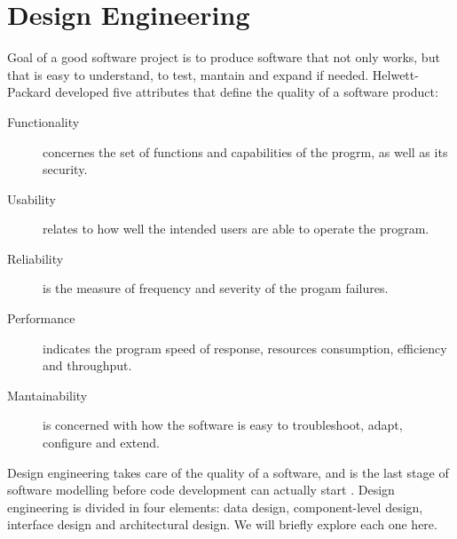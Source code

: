 \section{Design Engineering}
Goal of a good software project is to produce software that not only works, but
that is easy to understand, to test, mantain and expand if needed.
Helwett-Packard developed five attributes \cite{RG87} that define the quality of
a software product:
\begin{description}
\item [Functionality] concernes the set of functions and capabilities of the
progrm, as well as its security.
\item [Usability] relates to how well the intended users are able to operate the
program.
\item [Reliability] is the measure of frequency and severity of the progam
failures.
\item [Performance] indicates the program speed of response, resources
consumption, efficiency and throughput.
\item [Mantainability] is concerned with how the software is easy to
troubleshoot, adapt, configure and extend.
\end{description}

Design engineering takes care of the quality of a software, and is the last
stage of software modelling before code development can actually start
\cite{RP05}.
Design engineering is divided in four elements: data design, component-level design,
interface design and architectural design. We will briefly explore each one
here.

